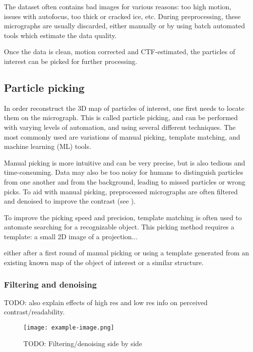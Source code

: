 The dataset often contains bad images for various reasons: too high motion, issues with autofocus, too thick or cracked ice, etc.
During preprocessing, these micrographs are usually discarded, either manually or by using batch automated tools which estimate the data quality.

Once the data is clean, motion corrected and CTF-estimated, the particles of interest can be picked for further processing.

\subsection{Particle picking}

In order reconstruct the 3D map of particles of interest, one first needs to locate them on the micrograph.
This is called particle picking, and can be performed with varying levels of automation, and using several different techniques.
The most commonly used are variations of manual picking, template matching, and machine learning (ML) tools.

Manual picking is more intuitive and can be very precise, but is also tedious and time-consuming.
Data may also be too noisy for humans to distinguish particles from one another and from the background, leading to missed particles or wrong picks.
To aid with manual picking, preprocessed micrographs are often filtered and denoised to improve the contrast (see ).

To improve the picking speed and precision, template matching is often used to automate searching for a recognizable object.
This picking method requires a template: a small 2D image of a projection...


either after a first round of manual picking or using a template generated from an existing known map of the object of interest or a similar structure.

\subsubsection{Filtering and denoising}\label{filtering_and_denoising}

TODO: also explain effects of high res and low res info on perceived contrast/readability.

\begin{figure}[ht]
    \centering
    \texttt{[image: example-image.png]}
    \caption{TODO: Filtering/denoising side by side}
    \label{fig:filtering}
\end{figure}


